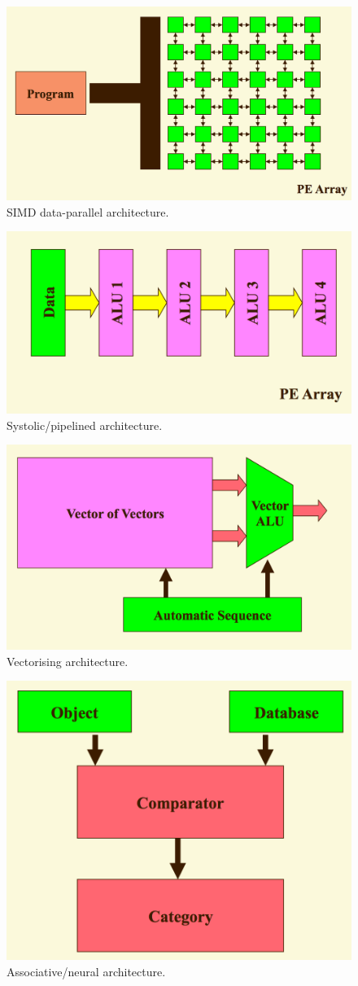 \begin{figure}
\centering
\includegraphics[width=0.5\linewidth]{figures/screenshot098}
\caption{SIMD data-parallel architecture.}
\label{fig:screenshot098}
\end{figure}

\begin{figure}
\centering
\includegraphics[width=0.5\linewidth]{figures/screenshot099}
\caption{Systolic/pipelined architecture.}
\label{fig:screenshot099}
\end{figure}

\begin{figure}
\centering
\includegraphics[width=0.5\linewidth]{figures/screenshot100}
\caption{Vectorising architecture.}
\label{fig:screenshot100}
\end{figure}

\begin{figure}
\centering
\includegraphics[width=0.5\linewidth]{figures/screenshot101}
\caption{Associative/neural architecture.}
\label{fig:screenshot101}
\end{figure}

